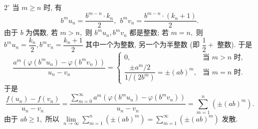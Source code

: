 \begin{solution}
\begin{enumerate}
$2^{\circ}$ 当 $m \geqslant n$ 时, 有
\begin{equation*}
b^m u_n = \dfrac{b^{m-n} \cdot k_n}{2}, ~~ b^m v_n = \dfrac{b^{m-n} \cdot (k_n+1)}{2}.
\end{equation*}
由于 $b$ 为偶数, 若 $m > n,$ 则 $b^m u_n, b^m v_n$ 都是整数;
若 $m = n,$ 则 $b^m u_n = \dfrac{k_n}{2}, b^m v_n = \dfrac{k_n + 1}{2}$ 其中一个为整数,
另一个为半整数 (即 $\dfrac{1}{2} +$ 整数). 于是
\begin{equation*}
\dfrac{a^m (\varphi(b^m u_n) - \varphi(b^m v_n))}{u_n - v_n}
= \begin{cases}
    0, & \text{当 } m > n \text{ 时}, \\
    \dfrac{\pm a^m / 2}{1 / (2 b^{m})} = \pm (ab)^m, & \text{当 } m = n \text{ 时}.
\end{cases}
\end{equation*}
于是
\begin{equation*}
\dfrac{f(u_n) - f(v_n)}{u_n - v_n}
= \dfrac{\sum\limits_{m=0}^{\infty} a^m (\varphi(b^m u_n) - \varphi(b^m v_n))}{u_n - v_n}
= \sum\limits_{m=1}^n \left( \pm (ab)^m \right).
\end{equation*}
由于 $ab \geqslant 1,$ 所以 $\displaystyle \lim\limits_{n\to\infty} \sum\limits_{m=1}^n \left( \pm (ab)^m \right) = \sum\limits_{m=1}^{\infty} \left( \pm (ab)^m \right)$ 发散.
\end{enumerate}
\end{solution}



